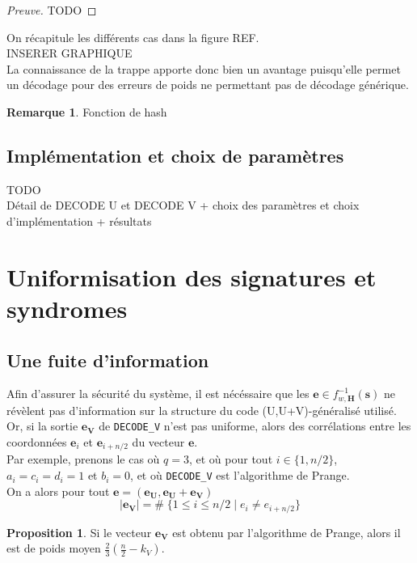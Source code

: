 \documentclass[12pt]{article}
\theoremstyle{definition}
\newtheorem{remarque}[thm]{Remarque}
\newtheorem{propo}[thm]{Proposition}
\begin{document}
\begin{proof}[Preuve]
TODO
\end{proof}

On récapitule les différents cas dans la figure REF. \\
INSERER GRAPHIQUE \\
La connaissance de la trappe apporte donc bien un avantage puisqu'elle permet un décodage pour des erreurs de poids ne permettant pas de décodage générique. 

\begin{remarque} Fonction de hash
\end{remarque}

\subsection{Implémentation et choix de paramètres}
TODO \\
Détail de DECODE U et DECODE V + choix des paramètres et choix d'implémentation + résultats \\

\section{Uniformisation des signatures et syndromes}

\subsection{Une fuite d'information}
Afin d'assurer la sécurité du système, il est nécéssaire que les $\mathbf{e} \in f_{w,\mathbf{H}}^{-1}(\mathbf{s})$ ne révèlent pas d'information sur la structure du code (U,U+V)-généralisé utilisé. \\
Or, si la sortie $\mathbf{e_V}$ de \verb|DECODE_V| n'est pas uniforme, alors des corrélations entre les coordonnées $\mathbf{e}_i$ et $\mathbf{e}_{i+n/2}$ du vecteur $\mathbf{e}$. \\
Par exemple, prenons le cas où $q=3$, et où pour tout $i \in \{1,n/2\}$, $a_i = c_i = d_i = 1$ et $b_i = 0$, et où \verb|DECODE_V| est l'algorithme de Prange. \\
On a alors pour tout $\mathbf{e} = (\mathbf{e_U},\mathbf{e_U}+\mathbf{e_V})$
$$ |\mathbf{e_V}| = \# \; \{1  \leq i \leq n/2 \;|\; e_i \neq e_{i+n/2}\}$$

\begin{propo}
Si le vecteur $\mathbf{e_V}$ est obtenu par l'algorithme de Prange, alors il est de poids moyen $\frac{2}{3}(\frac{n}{2}-k_V)$.
\end{propo}
\end{document}
